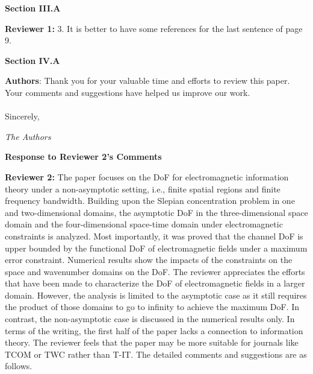 \documentclass[a4paper,12pt]{article}
\begin{document}
\begin{framed}
	{\bf Section III.A}

  

\end{framed}

\textbf{Reviewer 1:}
3. It is better to have some references for the last sentence of page 9. 

{}

\begin{framed}
	{\bf Section IV.A}

    
\end{framed}

{\color{blue} \textbf{Authors}: Thank you for your valuable time and efforts to review this paper. Your comments and suggestions have helped us improve our work.
	\\
	\\
	Sincerely,
	
	{\it The Authors}
}


\clearpage


\begin{center}
    {\Large\bf Response to Reviewer 2's Comments}
\end{center}

\textbf{Reviewer 2:}
The paper focuses on the DoF for electromagnetic information theory under a non-asymptotic setting, i.e., finite spatial regions and finite frequency bandwidth. Building upon the Slepian concentration problem in one and two-dimensional domains, the asymptotic DoF in the three-dimensional space domain and the four-dimensional space-time domain under electromagnetic constraints is analyzed. Most importantly, it was proved that the channel DoF is upper bounded by the functional DoF of electromagnetic fields under a maximum error constraint. Numerical results show the impacts of the constraints on the space and wavenumber domains on the DoF. The reviewer appreciates the efforts that have been made to characterize the DoF of electromagnetic fields in a larger domain. However, the analysis is limited to the asymptotic case as it still requires the product of those domains to go to infinity to achieve the maximum DoF. In contrast, the non-asymptotic case is discussed in the numerical results only. In terms of the writing, the first half of the paper lacks a connection to information theory. The reviewer feels that the paper may be more suitable for journals like TCOM or TWC rather than T-IT. The detailed comments and suggestions are as follows.
\end{document}
